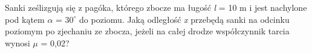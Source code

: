 Sanki ześlizgują się z pagóka, którego zbocze ma ługość \emph{l} = 10 m i jest nachylone pod kątem $\alpha$ = $30^{\circ}$ do poziomu. Jaką odległość \emph{x} przebędą sanki na odcinku poziomym po zjechaniu ze zbocza, jeżeli na całej drodze współczynnik tarcia wynosi $\mu$ = 0,02?



